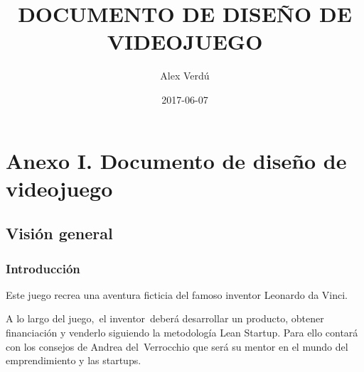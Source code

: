 \setlength\footskip{0.0cm}
\setlength\headheight{0cm}
\setlength\headsep{0cm}
\setlength{\skip\footins}{1.1777999mm}
\renewcommand\footnoterule{\vspace*{-0.007in}\setlength\leftskip{0pt}\setlength\rightskip{0pt plus 1fil}\noindent\textcolor{black}{\rule{0.33\columnwidth}{0.007in}}\vspace*{1mm}}
\makeatletter
\newcommand\ps@MP{
  \renewcommand\@oddhead{}
  \renewcommand\@evenhead{}
  \renewcommand\@oddfoot{}
  \renewcommand\@evenfoot{}
  \renewcommand\thepage{\arabic{page}}
}
\newcommand\ps@MPF{
  \renewcommand\@oddhead{}
  \renewcommand\@evenhead{}
  \renewcommand\@oddfoot{}
  \renewcommand\@evenfoot{}
  \renewcommand\thepage{\arabic{page}}
}
\makeatother
\pagestyle{MP}
\title{DOCUMENTO DE DISE\~NO DE VIDEOJUEGO}
\author{Alex Verd\'u}
\date{2017-06-07}
%
\chapter{Anexo I. Documento de diseño de videojuego}
\label{GDD}




\clearpage\clearpage\setcounter{page}{1}\pagestyle{MP}
\thispagestyle{MPF}

\clearpage
\bigskip

\section[]{ }
\section[Visi\'on general]{ Visi\'on general}
\hypertarget{Toc484614208}{}\subsection[Introducci\'on]{ Introducci\'on}
\hypertarget{Toc484614209}{}{
Este juego recrea una aventura ficticia del famoso inventor Leonardo da Vinci.\ }

{
A lo largo del juego,\ el inventor\ deber\'a desarrollar un producto, obtener financiaci\'on y venderlo siguiendo la
metodolog\'ia Lean Startup. Para ello contar\'a con los consejos de Andrea del\ Verrocchio que ser\'a su mentor en el
mundo del emprendimiento y las startups.}

